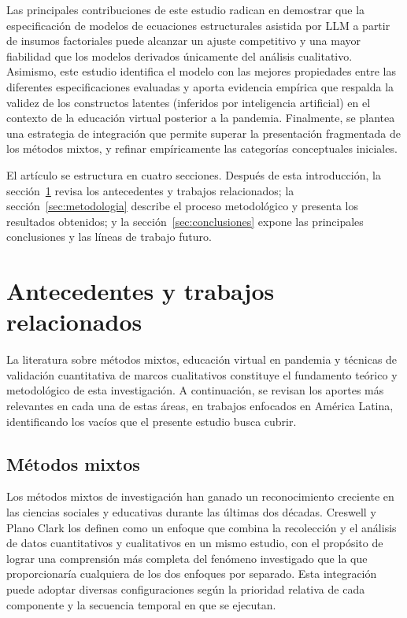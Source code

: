 \documentclass[conference]{IEEEtran}
\begin{document}
Las principales contribuciones de este estudio radican en demostrar que la especificación de modelos de ecuaciones estructurales asistida por LLM a partir de insumos factoriales puede alcanzar un ajuste competitivo y una mayor fiabilidad que los modelos derivados únicamente del análisis cualitativo. Asimismo, este estudio identifica el modelo con las mejores propiedades entre las diferentes especificaciones evaluadas y aporta evidencia empírica que respalda la validez de los constructos latentes (inferidos por inteligencia artificial) en el contexto de la educación virtual posterior a la pandemia. Finalmente, se plantea una estrategia de integración que permite superar la presentación fragmentada de los métodos mixtos, y refinar empíricamente las categorías conceptuales iniciales.

El artículo se estructura en cuatro secciones. Después de esta introducción, la sección~\ref{sec:antecedentes} revisa los antecedentes y trabajos relacionados; la sección~\ref{sec:metodologia} describe el proceso metodológico y presenta los resultados obtenidos; y la sección~\ref{sec:conclusiones} expone las principales conclusiones y las líneas de trabajo futuro.

\section{Antecedentes y trabajos relacionados}
\label{sec:antecedentes}
La literatura sobre métodos mixtos, educación virtual en pandemia y técnicas de validación cuantitativa de marcos cualitativos constituye el fundamento teórico y metodológico de esta investigación. A continuación, se revisan los aportes más relevantes en cada una de estas áreas, en trabajos enfocados en América Latina, identificando los vacíos que el presente estudio busca cubrir.

\subsection{Métodos mixtos}

Los métodos mixtos de investigación han ganado un reconocimiento creciente en las ciencias sociales y educativas durante las últimas dos décadas. Creswell y Plano Clark \cite{creswellDesigningConductingMixed} los definen como un enfoque que combina la recolección y el análisis de datos cuantitativos y cualitativos en un mismo estudio, con el propósito de lograr una comprensión más completa del fenómeno investigado que la que proporcionaría cualquiera de los dos enfoques por separado. Esta integración puede adoptar diversas configuraciones según la prioridad relativa de cada componente y la secuencia temporal en que se ejecutan.
\end{document}
